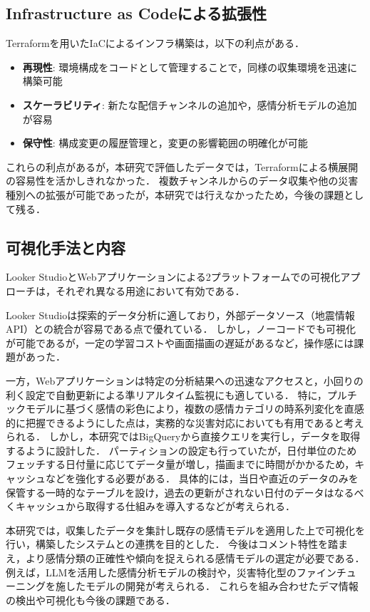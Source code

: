 \subsection{Infrastructure as Codeによる拡張性}

Terraformを用いたIaCによるインフラ構築は，以下の利点がある．

\begin{itemize}
    \item \textbf{再現性}: 環境構成をコードとして管理することで，同様の収集環境を迅速に構築可能
    \item \textbf{スケーラビリティ}: 新たな配信チャンネルの追加や，感情分析モデルの追加が容易
    \item \textbf{保守性}: 構成変更の履歴管理と，変更の影響範囲の明確化が可能
\end{itemize}

これらの利点があるが，本研究で評価したデータでは，Terraformによる横展開の容易性を活かしきれなかった．
複数チャンネルからのデータ収集や他の災害種別への拡張が可能であったが，本研究では行えなかったため，今後の課題として残る．

\subsection{可視化手法と内容}

Looker StudioとWebアプリケーションによる2プラットフォームでの可視化アプローチは，それぞれ異なる用途において有効である．

Looker Studioは探索的データ分析に適しており，外部データソース（地震情報API）との統合が容易である点で優れている．
しかし，ノーコードでも可視化が可能であるが，一定の学習コストや画面描画の遅延があるなど，操作感には課題があった．

一方，Webアプリケーションは特定の分析結果への迅速なアクセスと，小回りの利く設定で自動更新による準リアルタイム監視にも適している．
特に，プルチックモデルに基づく感情の彩色により，複数の感情カテゴリの時系列変化を直感的に把握できるようにした点は，実務的な災害対応においても有用であると考えられる．
しかし，本研究ではBigQueryから直接クエリを実行し，データを取得するように設計した．
パーティションの設定も行っていたが，日付単位のためフェッチする日付量に応じてデータ量が増し，描画までに時間がかかるため，キャッシュなどを強化する必要がある．
具体的には，当日や直近のデータのみを保管する一時的なテーブルを設け，過去の更新がされない日付のデータはなるべくキャッシュから取得する仕組みを導入するなどが考えられる．

本研究では，収集したデータを集計し既存の感情モデルを適用した上で可視化を行い，構築したシステムとの連携を目的とした．
今後はコメント特性を踏まえ，より感情分類の正確性や傾向を捉えられる感情モデルの選定が必要である．
例えば，LLMを活用した感情分析モデルの検討や，災害特化型のファインチューニングを施したモデルの開発が考えられる．
これらを組み合わせたデマ情報の検出や可視化も今後の課題である．

